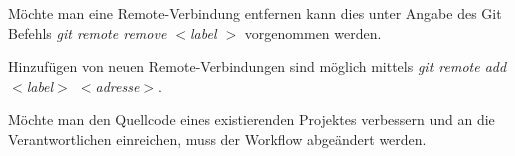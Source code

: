 Möchte man eine Remote-Verbindung entfernen kann dies unter Angabe des Git Befehls \textit{git remote remove  $ < $label $ > $} vorgenommen werden. 
  
Hinzufügen von neuen Remote-Verbindungen sind möglich mittels \textit{git remote add $ < $label$ > $ $ < $adresse$ > $}.

\begin{INFO}
  Möchte man den Quellcode eines existierenden Projektes verbessern und an die Verantwortlichen einreichen, muss der Workflow abgeändert werden.
\end{INFO}